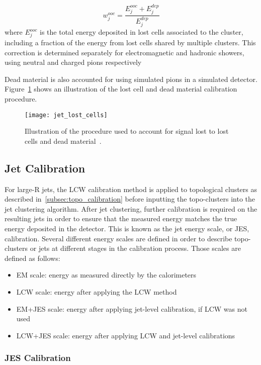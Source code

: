 \begin{equation}\label{eq:out_of_cluster}
    w_{j}^{ooc} = \frac{E_j^{ooc}+E^{dep}_j}{E^{dep}_j}
\end{equation}
where $E_j^{ooc}$ is the total energy deposited in lost cells associated to the cluster, including a fraction
of the energy from lost cells shared by multiple clusters.
This correction is determined separately for electromagnetic and hadronic showers, using neutral and charged pions
respectively\cite{jet-topo-cluster}

Dead material is also accounted for using simulated pions in a simulated detector.
Figure~\ref{fig:jet_lost_cells} shows an illustration of the lost cell and dead material calibration procedure.
\begin{figure}[!ht]
    \centering
\texttt{[image: jet\_lost\_cells]}
\caption{Illustration of the procedure used to account for signal lost to lost cells and dead material~\cite{jet-topo-cluster}.}
\label{fig:jet_lost_cells}
\end{figure}

\subsection{Jet Calibration}\label{subsec:jet_calibration}
For large-R jets, the LCW calibration method is applied to topological clusters as described in~\ref{subsec:topo_calibration} before inputting the topo-clusters into the jet clustering algorithm.
After jet clustering, further calibration is required on the resulting jets in order to ensure that the measured energy matches the true energy deposited in the detector.
This is known as the jet energy scale, or JES, calibration.
Several different energy scales are defined in order to describe topo-clusters or jets at different stages in the calibration process.
Those scales are defined as follows:

\begin{itemize}
    \item EM scale: energy as measured directly by the calorimeters
    \item LCW scale: energy after applying the LCW method
    \item EM+JES scale: energy after applying jet-level calibration, if LCW was not used
    \item LCW+JES scale: energy after applying LCW and jet-level calibrations
\end{itemize}

\subsubsection{JES Calibration}\label{subsubsec:jes_calibration}

